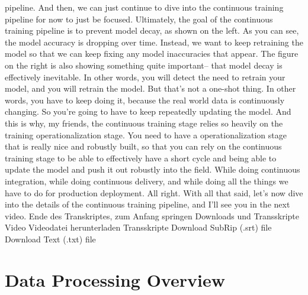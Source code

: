 {{{{    pipeline.
    And then, we can just continue to dive into the continuous training
    pipeline for now to just be focused.
    Ultimately, the goal of the continuous training pipeline
    is to prevent model decay, as shown on the left.
    As you can see, the model accuracy is dropping over time.
    Instead, we want to keep retraining the model so
    that we can keep fixing any model inaccuracies that appear.
    The figure on the right is also showing something quite important--
    that model decay is effectively inevitable.
    In other words, you will detect the need to retrain your model,
    and you will retrain the model.
    But that's not a one-shot thing.
    In other words, you have to keep doing it,
    because the real world data is continuously changing.
    So you're going to have to keep repeatedly updating the model.
    And this is why, my friends, the continuous training stage
    relies so heavily on the training operationalization stage.
    You need to have a operationalization stage that is really nice and robustly
    built, so that you can rely on the continuous training stage
    to be able to effectively have a short cycle
    and being able to update the model and push it out robustly into the field.
    While doing continuous integration, while doing continuous delivery,
    and while doing all the things we have to do for production deployment.
    All right.
    With all that said, let's now dive into the details of the continuous training
    pipeline, and I'll see you in the next video.
    Ende des Transkriptes, zum Anfang springen
    Downloads und Transskripte
    Video
    Videodatei herunterladen
    Transskripte
    Download SubRip (.srt) file
    Download Text (.txt) file        

\section{Data Processing Overview}

}}}}
